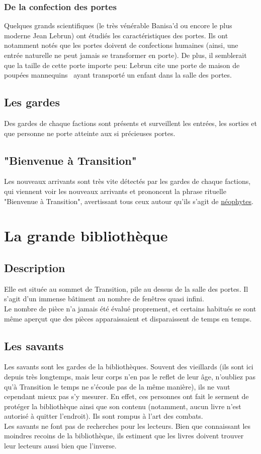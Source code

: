 \documentclass{book}
\begin{document}
\subsubsection{De la confection des portes}
Quelques grands scientifiques (le très vénérable Banisa'd ou encore le plus moderne Jean Lebrun) ont étudiés les caractéristiques des portes. Ils ont notamment notés que les portes doivent de confections humaines (ainsi, une entrée naturelle ne peut jamais se transformer en porte). De plus, il semblerait que la taille de cette porte importe peu: Lebrun cite une \guillemotleft porte de maison de poupées mannequins \guillemotright \ ayant transporté un enfant dans la salle des portes.

\subsection{Les gardes}
Des gardes de chaque factions sont présents et surveillent les entrées, les sorties et que personne ne porte atteinte aux si précieuses portes.

\subsection{"Bienvenue à Transition"}
Les nouveaux arrivants sont très vite détectés par les gardes de chaque factions, qui viennent voir les nouveaux arrivants et prononcent la phrase rituelle "Bienvenue à Transition", avertissant tous ceux autour qu'ils s'agit de \hyperlink{neophytes}{néophytes}.

\section{La grande bibliothèque}
\subsection{Description}
Elle est située au sommet de Transition, pile au dessus de la salle des portes. Il s'agit d'un immense bâtiment au nombre de fenêtres quasi infini.\\
Le nombre de pièce n'a jamais été évalué proprement, et certains habitués se sont même aperçut que des pièces apparaissaient et disparaissent de temps en temps.
\subsection{Les savants}
Les savants sont les gardes de la bibliothèques. Souvent des vieillards (ils sont ici depuis très longtemps, mais leur corps n'en pas le reflet de leur âge, n'oubliez pas qu'à Transition le temps ne s'écoule pas de la même manière), ils ne vaut cependant mieux pas s'y mesurer. En effet, ces personnes ont fait le serment de protéger la bibliothèque ainsi que son contenu (notamment, aucun livre n'est autorisé à quitter l'endroit). Ils sont rompus à l'art des combats.
\\
Les savants ne font pas de recherches pour les lecteurs. Bien que connaissant les moindres recoins de la bibliothèque, ils estiment que les livres doivent trouver leur lecteurs aussi bien que l'inverse.
\end{document}
